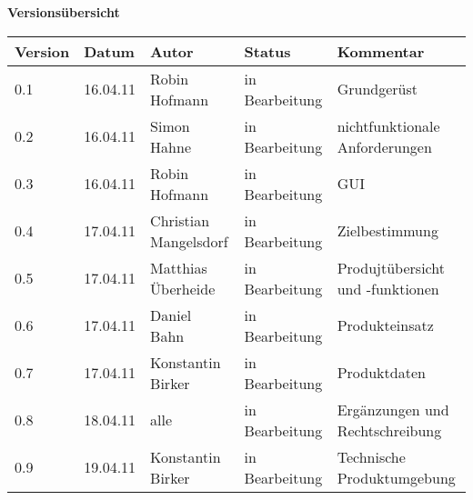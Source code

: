 

{\textbf{Versionsübersicht}}\\[2ex]

\begin{longtable}{|m{1.78cm}|m{1.59cm}|m{2.86cm}|m{1.9cm}|m{5.25cm}|}

  \hline                                              %

  \textbf{Version}  &    \textbf{Datum}  &    \textbf{Autor}  &
  \textbf{Status}   &    \textbf{Kommentar}  \\  %
  \hline                                              %

0.1&16.04.11&Robin Hofmann&in Bearbeitung&Grundgerüst\\
\hline 
0.2&16.04.11&Simon Hahne&in Bearbeitung&nichtfunktionale Anforderungen\\
\hline 
0.3&16.04.11&Robin Hofmann&in Bearbeitung&GUI\\
\hline 
0.4&17.04.11&Christian Mangelsdorf&in Bearbeitung&Zielbestimmung\\
\hline 
0.5&17.04.11&Matthias Überheide&in Bearbeitung&Produjtübersicht und -funktionen\\
\hline 
0.6&17.04.11&Daniel Bahn&in Bearbeitung&Produkteinsatz\\
\hline 
0.7&17.04.11&Konstantin Birker&in Bearbeitung&Produktdaten\\
\hline 
0.8&18.04.11&alle&in Bearbeitung&Ergänzungen und Rechtschreibung\\
\hline 
0.9&19.04.11&Konstantin Birker&in Bearbeitung&Technische Produktumgebung\\
\hline 


\end{longtable}





